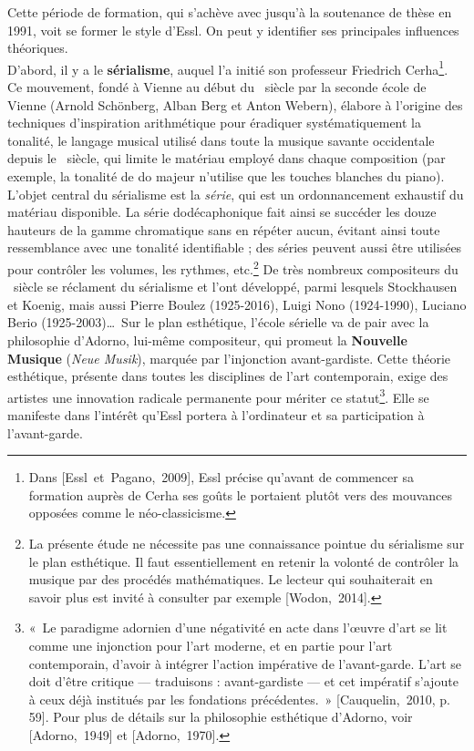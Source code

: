 \documentclass[a4paper,12pt]{article}
\newcommand{\guill}[1]{«~#1~»}
\newcommand{\cicite}[1]{{\footnotesize[#1]}}
\begin{document}
Cette période de formation, qui s'achève avec jusqu'à la soutenance de thèse en 1991, voit se former le style d'Essl. On peut y identifier ses principales influences théoriques. \\
D'abord, il y a le \textbf{sérialisme}, auquel l'a initié son professeur Friedrich Cerha\footnote{Dans \cicite{Essl~et~Pagano,~2009}, Essl précise qu'avant de commencer sa formation auprès de Cerha ses goûts le portaient plutôt vers des mouvances opposées comme le néo-classicisme.}. Ce mouvement, fondé à Vienne au début du \XXe~siècle par la seconde école de Vienne (Arnold Schönberg, Alban Berg et Anton Webern), élabore à l'origine des techniques d'inspiration arithmétique pour éradiquer systématiquement la tonalité, le langage musical utilisé dans toute la musique savante occidentale depuis le \XVIIIe~siècle, qui limite le matériau employé dans chaque composition (par exemple, la tonalité de do majeur n'utilise que les touches blanches du piano). L'objet central du sérialisme est la \emph{série}, qui est un ordonnancement exhaustif du matériau disponible. La série dodécaphonique fait ainsi se succéder les douze hauteurs de la gamme chromatique sans en répéter aucun, évitant ainsi toute ressemblance avec une tonalité identifiable ; des séries peuvent aussi être utilisées pour contrôler les volumes, les rythmes, etc.\footnote{La présente étude ne nécessite pas une connaissance pointue du sérialisme sur le plan esthétique. Il faut essentiellement en retenir la volonté de contrôler la musique par des procédés mathématiques. Le lecteur qui souhaiterait en savoir plus est invité à consulter par exemple \cicite{Wodon,~2014}.} De très nombreux compositeurs du \XXe~siècle se réclament du sérialisme et l'ont développé, parmi lesquels Stockhausen et Koenig, mais aussi Pierre Boulez (1925-2016), Luigi Nono (1924-1990), Luciano Berio (1925-2003)\dots~Sur le plan esthétique, l'école sérielle va de pair avec la philosophie d'Adorno, lui-même compositeur, qui promeut la \textbf{Nouvelle Musique} (\emph{Neue Musik}), marquée par l'injonction avant-gardiste. Cette théorie esthétique, présente dans toutes les disciplines de l'art contemporain, exige des artistes une innovation radicale permanente pour mériter ce statut\footnote{\guill{Le paradigme adornien d'une négativité en acte dans l'œuvre d'art se lit comme une injonction pour l'art moderne, et en partie pour l'art contemporain, d'avoir à intégrer l'action impérative de l'avant-garde. L'art se doit d'être critique --- traduisons : avant-gardiste --- et cet impératif s'ajoute à ceux déjà institués par les fondations précédentes.} \cicite{Cauquelin,~2010, p. 59}. Pour plus de détails sur la philosophie esthétique d'Adorno, voir \cicite{Adorno,~1949} et \cicite{Adorno,~1970}.}. Elle se manifeste dans l'intérêt qu'Essl portera à l'ordinateur et sa participation à l'avant-garde. \\
\end{document}
